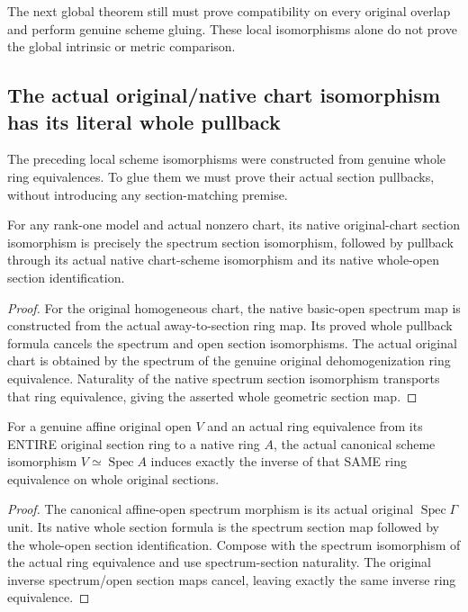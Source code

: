 The next global theorem still must prove compatibility on every
original overlap and perform genuine scheme gluing. These local
isomorphisms alone do not prove the global intrinsic or metric comparison.

\subsection{The actual original/native chart isomorphism has its literal whole pullback}
The preceding local scheme isomorphisms were constructed from genuine whole
ring equivalences. To glue them we must prove their actual section pullbacks,
without introducing any section-matching premise.

\begin{lemma}
\label{lem:seven-native-original-chart-geometric-sections-route}
\leanok
{}
For any rank-one model and actual nonzero chart, its native original-chart
section isomorphism is precisely the spectrum section isomorphism, followed
by pullback through its actual native chart-scheme isomorphism and its native
whole-open section identification.
\end{lemma}
\begin{proof}
For the original homogeneous chart, the native basic-open spectrum map is
constructed from the actual away-to-section ring map. Its proved whole
pullback formula cancels the spectrum and open section isomorphisms. The
actual original chart is obtained by the spectrum of the genuine original
dehomogenization ring equivalence. Naturality of the native spectrum section
isomorphism transports that ring equivalence, giving the asserted whole
geometric section map.
\end{proof}

\begin{lemma}
\label{lem:seven-affine-open-ring-equivalence-geometric-sections-route}
\leanok
{}
For a genuine affine original open $V$ and an actual ring equivalence from
its ENTIRE original section ring to a native ring $A$, the actual canonical
scheme isomorphism $V\simeq\operatorname{Spec}A$ induces exactly the inverse
of that SAME ring equivalence on whole original sections.
\end{lemma}
\begin{proof}
The canonical affine-open spectrum morphism is its actual original
$\operatorname{Spec}\Gamma$ unit. Its native whole section formula is the
spectrum section map followed by the whole-open section identification.
Compose with the spectrum isomorphism of the actual ring equivalence and
use spectrum-section naturality. The original inverse spectrum/open section
maps cancel, leaving exactly the same inverse ring equivalence.
\end{proof}


